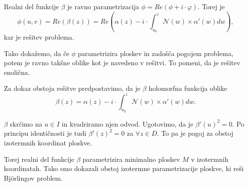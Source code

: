 \documentclass{article}
\begin{document}
    Realni del funkcije $\beta$ je ravno parametrizacija $\phi = Re(\phi + i \cdot \varphi)$. Torej je 
    $$ \phi(u, v) = Re(\beta(z)) = Re(\alpha(z) - i \cdot \int_{u_0}^{z} \mathcal{N} (w) \times \alpha'(w) dw),$$
    kar je rešitev problema.

    Tako dokažemo, da če $\phi$ parametrizira ploskev in zadošča pogojem problema, potem je ravno takšne oblike kot je 
    navedeno v rešitvi. To pomeni, da je rešitev enolična.

    Za dokaz obstoja rešitve predpostavimo, da je $\beta$ holomorfna funkcija oblike
    $$\beta(z) = \alpha(z) - i \cdot \int_{u_0}^{z} \mathcal{N} (w) \times \alpha'(w) dw.$$

    $\beta$ skrčimo na $u \in I$ in kvadriramo njen odvod. Ugotovimo, da je $\beta'(u)^2 = 0$.
    Po principu identičnosti je tudi $\beta'(z)^2 = 0$ za $\forall z \in D$.
    To pa je pogoj za obstoj izotermnih koordinat ploskve.

    Torej realni del funkcije $\beta$ parametrizira minimalno ploskev $M$ v izotermnih koordinatah.
    Tako smo dokazali obstoj izotermne parametrizacije ploskve, ki reši Björlingov problem.
\end{document}
